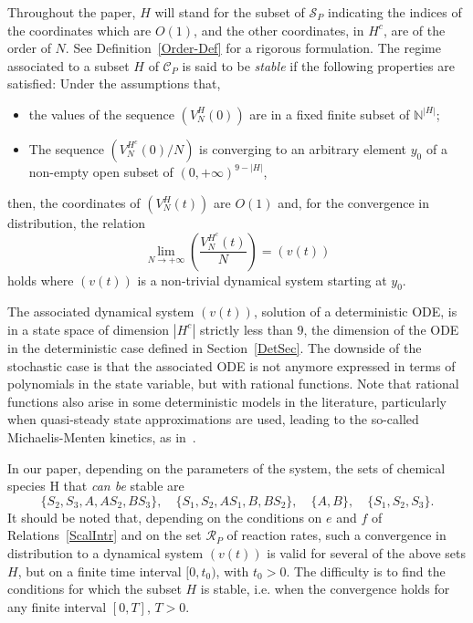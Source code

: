 \documentclass[english]{amsart}
\newcommand{\N}{\ensuremath{\mathbb{N}}}
\newcommand{\cal}[1]{\ensuremath{\mathcal{#1}}}
\numberwithin{proposition}{section}
\begin{document}
Throughout the paper,  $H$ will stand for the subset of ${\cal S}_P$ indicating the indices of the coordinates which are $O(1)$, and the other coordinates,  in $H^c$, are  of the order of $N$.  See  Definition~\ref{Order-Def} for a rigorous formulation. 
The regime associated to a subset $H$ of ${\cal C}_P$ is said to be {\em stable} if the following properties are satisfied: Under the assumptions that,
\begin{itemize}
\item[---]
  the values of the sequence $(V^{H}_N(0))$ are in a fixed finite subset of $\N^{|H|}$;
\item[---]
  The sequence $(V^{H^c}_N(0)/N)$  is converging to an arbitrary element $y_0$ of a non-empty open subset of $(0,{+}\infty)^{9-|H|}$,
\end{itemize}
then, the coordinates of $(V^{H}_N(t))$ are $O(1)$  and, for the convergence in distribution,  the relation
\begin{equation}\label{Dynv}
\lim_{N\to+\infty} \left(\frac{V^{H^c}_N(t)}{N}\right)=(v(t))
\end{equation}
holds where $(v(t))$ is a non-trivial dynamical system starting at $y_0$. 

The associated dynamical system $(v(t))$, solution of a deterministic ODE, is in a state space of dimension $|H^c|$  strictly less than $9$,  the dimension of the ODE in the deterministic case defined in Section~\ref{DetSec}. The downside of the stochastic case is that the associated ODE is not anymore expressed in terms of polynomials in the state variable, but with rational functions. Note that rational functions also arise in some deterministic models in the literature, particularly when quasi-steady state approximations are used, leading to the so-called Michaelis-Menten kinetics, as in~\citet{Markevich2004}.

In our paper, depending on the parameters of the system, the sets of chemical species H that {\em can be} stable are
\[
\{{ S}_2,{ S}_3, { A},  { AS}_2, { BS}_3\},\quad
\{  { S}_1, { S}_2,  { AS}_1,{ B},  { BS}_2\},\quad 
\{   { A}, { B}\},\quad
\{  { S}_1, { S}_2,{ S}_3\}.
\]
It should be noted that, depending on the conditions on $e$ and $f$ of Relations~\eqref{ScalIntr} and on the set ${\cal R}_P$ of reaction rates, such a convergence in distribution to a dynamical system $(v(t))$ is valid for several of the above sets $H$, but on a finite time interval $[0,t_0)$, with $t_0{>}0$. The difficulty is to find the conditions for which the subset $H$ is stable, i.e. when the convergence holds for any finite interval $[0, T]$, $T{>}0$.
\end{document}
